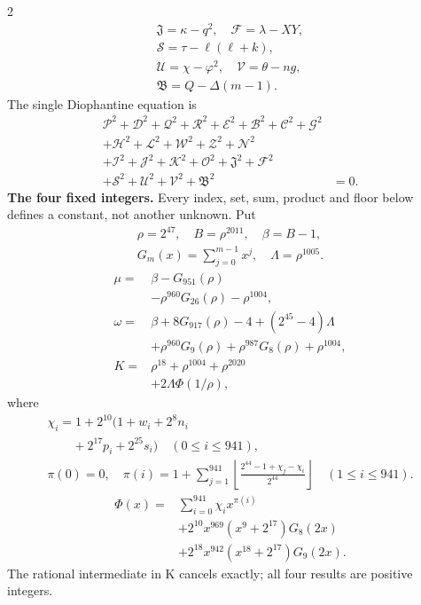 \documentclass[10pt]{article}
\newcommand{\fl}[1]{\left\lfloor#1\right\rfloor}
\begin{document}
\begin{multicols}{2}
\[\begin{gathered}
\mathfrak{J}=\kappa-q^2,\quad\mathcal{F}=\lambda-XY,\\
\mathcal{S}=\tau-\ell(\ell+k),\\
\mathcal{U}=\chi-\varphi^2,\quad\mathcal{V}=\theta-ng,\\
\mathfrak{B}=Q-\Delta(m-1).
\end{gathered}
\]
The single Diophantine equation is
\[
\begin{split}
\mathcal{P}^2+\mathcal{D}^2+\mathcal{Q}^2+\mathcal{R}^2+\mathcal{E}^2+\mathcal{B}^2+\mathcal{C}^2+\mathcal{G}^2 &\\
+\mathcal{H}^2+\mathcal{L}^2+\mathcal{W}^2+\mathcal{Z}^2+\mathcal{N}^2 &\\
+\mathcal{I}^2+\mathcal{J}^2+\mathcal{K}^2+\mathcal{O}^2+\mathfrak{J}^2+\mathcal{F}^2 &\\
+\mathcal{S}^2+\mathcal{U}^2+\mathcal{V}^2+\mathfrak{B}^2 &= 0.
\end{split}
\]
\textbf{The four fixed integers.}
Every index, set, sum, product and floor below defines a constant, not
another unknown. Put
\[
\begin{gathered}
\rho=2^{47},\quad B=\rho^{2011},\quad\beta=B-1,\\
G_m(x)=\sum_{j=0}^{m-1}x^j,\quad
\Lambda=\rho^{1005}.
\end{gathered}
\]
\begin{align*}
\mu={}&\beta-G_{951}(\rho)\\
&-\rho^{960}G_{26}(\rho)-\rho^{1004},\\
\omega={}&\beta+8G_{917}(\rho)-4+(2^{45}-4)\Lambda\\
&+\rho^{960}G_9(\rho)+\rho^{987}G_8(\rho)
  +\rho^{1004},\\
K={}&\rho^{18}+\rho^{1004}+\rho^{2020}\\
&+2\Lambda\Phi(1/\rho),
\end{align*}
where
\[
\begin{gathered}
\chi_i=1+2^{10}(1+w_i+2^8n_i\\
\qquad+2^{17}p_i+2^{25}s_i)\quad(0\le i\le941),\\
\pi(0)=0,\quad\pi(i)=1+\sum_{j=1}^{941}
\fl{\frac{2^{44}-1+\chi_j-\chi_i}{2^{44}}}\quad(1\le i\le941).
\end{gathered}
\]
\[
\begin{split}
\Phi(x)={}&\sum_{i=0}^{941}\chi_i x^{\pi(i)}\\
&+2^{10}x^{969}(x^9+2^{17})G_8(2x)\\
&+2^{18}x^{942}(x^{18}+2^{17})G_9(2x).
\end{split}
\]
The rational intermediate in K cancels exactly; all four results are positive integers.


\end{multicols}
\end{document}
